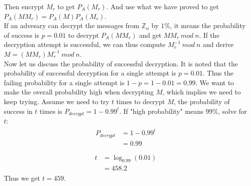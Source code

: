\documentclass[titlepage, paper=a4, fontsize=11pt]{scrartcl} %
\numberwithin{equation}{section} %
\numberwithin{figure}{section} %
\numberwithin{table}{section} %
\begin{document}
Then encrypt $M_r$ to get $P_A(M_r)$. And use what we have proved to get
$P_A(MM_r) = P_A(M)P_A(M_r)$. \\

If an advesary can decrypt the messages from $\mathbb{Z}_n$ by $1\%$, it means the probability of success
is $p = 0.01$ to decrypt $P_A(MM_r)$ and get $MM_r \ mod \ n$. If the decryption attempt is successful,
we can thus compute $M_r^{-1} \ mod \ n$ and derive $M = (MM_r)M_r^{-1} \ mod \ n$. \\

Now let us discuss the probability of successful decryption. It is noted that the probability of successful decryption
for a single attempt is $p = 0.01$. Thus the failing probability for a single attempt is $1-p = 1- 0.01 = 0.99$.
We want to make the overall probability high when decrypting $M$, which implies we need to keep trying.
Assume we need to try $t$ times to decrypt $M$, the probability of success in $t$ times is
$P_{decrypt} = 1-0.99^t$. If "high probability" means $99\%$, solve for $t$:
\begin{align*} 
\begin{split}
P_{decrypt} &= 1 - 0.99^t \\
&= 0.99 \\
\end{split}					
\end{align*}
\begin{align*} 
\begin{split}
t &= \log_{0.99}(0.01) \\
&= 458.2
\end{split}					
\end{align*}
Thus we get $t = 459$.
\\
\end{document}
